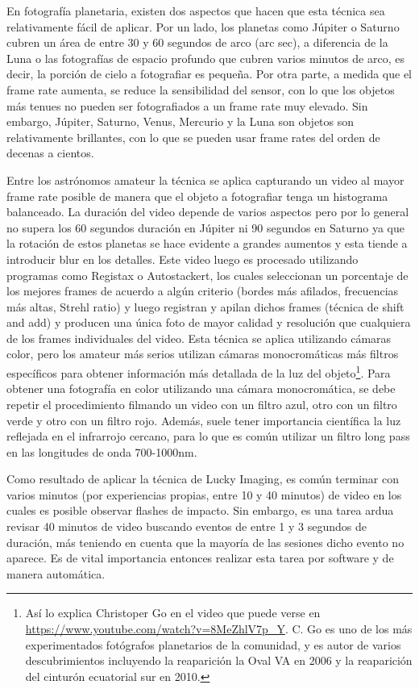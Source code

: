 \documentclass[a4paper,10pt]{article}
\begin{document}
En fotografía planetaria, existen dos aspectos que hacen que esta técnica sea 
relativamente fácil de aplicar. Por un lado, los planetas como Júpiter o Saturno cubren 
un área de entre 30 y 60 segundos de arco (arc sec), a diferencia de la Luna o las 
fotografías de espacio profundo que cubren varios minutos de arco, es decir, la porción 
de cielo a fotografiar es pequeña. Por otra parte, a medida que el frame rate aumenta, 
se reduce la sensibilidad del sensor, con lo que los objetos más tenues no pueden ser 
fotografiados a un frame rate muy elevado. Sin embargo, Júpiter, Saturno, Venus, Mercurio 
y la Luna son objetos son relativamente brillantes, con lo que se pueden usar frame rates 
del orden de decenas a cientos. 

Entre los astrónomos amateur la técnica se aplica capturando un video al mayor frame rate 
posible de manera que el objeto a fotografiar tenga un histograma balanceado. La duración 
del video depende de varios aspectos pero por lo general no supera los 60 segundos 
duración en Júpiter ni 90 segundos en Saturno ya que la rotación de estos planetas se 
hace evidente a grandes aumentos y esta tiende a introducir blur en los detalles. Este 
video luego es procesado utilizando programas como Registax o Autostackert, los cuales 
seleccionan un porcentaje de los mejores frames de acuerdo a algún criterio (bordes más 
afilados, frecuencias más altas, Strehl ratio) y luego registran y apilan dichos frames 
(técnica de shift and add) y producen una única foto de mayor calidad y resolución que 
cualquiera de los frames individuales del video. Esta técnica se aplica utilizando cámaras 
color, pero los amateur más serios utilizan cámaras monocromáticas más filtros específicos 
para obtener información más detallada de la luz del objeto\footnote{Así lo explica 
Christoper Go en el video que puede verse en 
\url{https://www.youtube.com/watch?v=8MeZhlV7p_Y}. C. Go es uno de los más experimentados 
fotógrafos planetarios de la comunidad, y es autor de varios descubrimientos incluyendo la 
reaparición la Oval VA en 2006 y la reaparición del cinturón ecuatorial sur en 2010.}. 
Para obtener una fotografía en color utilizando una cámara monocromática, se debe repetir 
el procedimiento filmando un video con un filtro azul, otro con un filtro verde y otro con 
un filtro rojo. Además, suele tener importancia científica la luz reflejada en el 
infrarrojo cercano, para lo que es común utilizar un filtro long pass en las longitudes de 
onda 700-1000nm. 

Como resultado de aplicar la técnica de Lucky Imaging, es común terminar con varios 
minutos (por experiencias propias, entre 10 y 40 minutos) de video en los cuales es 
posible observar flashes de impacto. Sin embargo, es una tarea ardua revisar 40 minutos 
de video buscando eventos de entre 1 y 3 segundos de duración, más teniendo en cuenta que 
la mayoría de las sesiones dicho evento no aparece. Es de vital importancia entonces 
realizar esta tarea por software y de manera automática.
\end{document}

